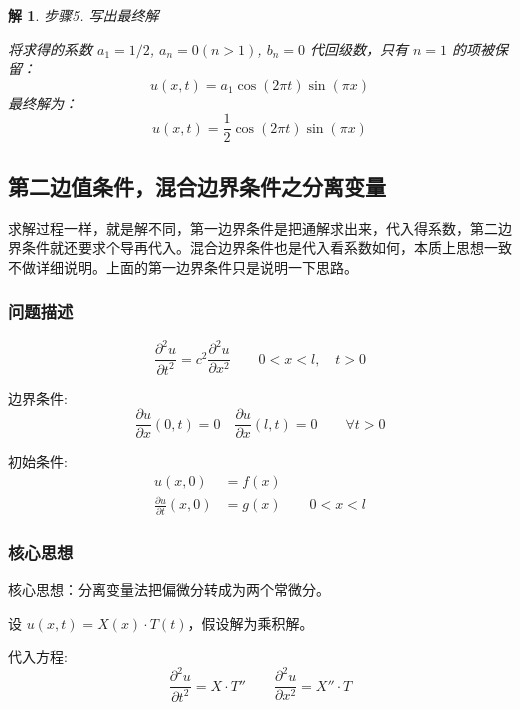 \documentclass[12pt,a4paper]{article}
\numberwithin{subsection}{section}   %
\numberwithin{subsubsection}{subsection}
\theoremstyle{plain}
\newtheorem{solution}{解}[subsection]  %
\theoremstyle{definition}
\theoremstyle{remark}
\theoremstyle{remark}
\begin{document}
\begin{solution}
	步骤5. 写出最终解
		
		\noindent
		将求得的系数 $a_1=1/2$, $a_n=0 (n>1)$, $b_n=0$ 代回级数，只有 $n=1$ 的项被保留：
		\[
		u(x,t) = a_1 \cos(2\pi t) \sin(\pi x)
		\]
		最终解为：
		\[
		u(x,t) = \frac{1}{2}\cos(2\pi t)\sin(\pi x)
		\]
	\end{solution}
	
	
		\subsection{第二边值条件，混合边界条件之分离变量}
求解过程一样，就是解不同，第一边界条件是把通解求出来，代入得系数，第二边界条件就还要求个导再代入。混合边界条件也是代入看系数如何，本质上思想一致不做详细说明。上面的第一边界条件只是说明一下思路。
	\subsubsection{问题描述}
	\begin{equation} \label{eq:wave_equation_neumann}
		\frac{\partial^2 u}{\partial t^2} = c^2 \frac{\partial^2 u}{\partial x^2} \qquad 0 < x < l, \quad t > 0
	\end{equation}
	
	边界条件:
	\begin{equation} \label{eq:boundary_conditions_neumann}
		\frac{\partial u}{\partial x}(0, t) = 0 \quad \frac{\partial u}{\partial x}(l, t) = 0 \qquad \forall t > 0
	\end{equation}
	
	初始条件:
	\begin{equation} \label{eq:initial_conditions_neumann}
		\begin{aligned}
			u(x, 0) &= f(x) \\
			\frac{\partial u}{\partial t}(x, 0) &= g(x) \qquad 0 < x < l
		\end{aligned}
	\end{equation}
	
	\subsubsection{核心思想}
	核心思想：分离变量法把偏微分转成为两个常微分。
	
	设 \(u(x, t) = X(x) \cdot T(t)\)，假设解为乘积解。
	
	代入方程:
	\begin{equation} \label{eq:substitution_neumann}
		\frac{\partial^2 u}{\partial t^2} = X \cdot T'' \qquad \frac{\partial^2 u}{\partial x^2} = X'' \cdot T
	\end{equation}
	
\end{document}
